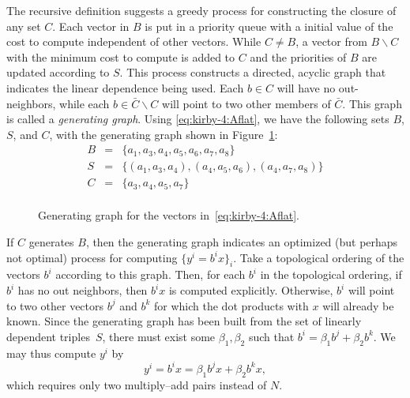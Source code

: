 The recursive definition suggests a greedy process for constructing
the closure of any set $ C $.  Each vector in $B$ is put in a priority
queue with a initial value of the cost to compute independent of other
vectors. While $C \ne B$, a vector from $B \backslash C$ with the
minimum cost to compute is added to $C$ and the priorities of $B$ are
updated according to $S$.  This process constructs a directed, acyclic
graph that indicates the linear dependence being used.  Each $ b \in C
$ will have no out-neighbors, while each $ b \in \bar{C} \backslash C
$ will point to two other members of $ \bar{C} $.  This graph is
called a \emph{generating graph}. Using \eqref{eq:kirby-4:Aflat}, we
have the following sets $B$, $S$, and $C$, with the generating graph
shown in Figure~\ref{fig:kirby-4:gg}:
\begin{equation}
\begin{array}{rcl}
 B & = &  \{a_1, a_3, a_4, a_5, a_6, a_7, a_8\} \\
 S & = & \{(a_1, a_3, a_4),(a_4, a_5, a_6), (a_4, a_7, a_8)\} \\
 C & = & \{a_3, a_4, a_5, a_7\} \\
\end{array}
\end{equation}

\begin{figure}
  \begin{center}
  \def\svgwidth{\columnwidth} %
   
  \caption{Generating graph for the vectors in~\eqref{eq:kirby-4:Aflat}.}
  \label{fig:kirby-4:gg}
  \end{center}
\end{figure}

If $C$ generates $B$, then the generating graph indicates an optimized
(but perhaps not optimal) process for computing $\{ y^i = b^i x \}_i$.
Take a topological ordering of the vectors $b^i$ according to this
graph.  Then, for each $b^i$ in the topological ordering, if $b^i$ has
no out neighbors, then $b^i x$ is computed explicitly.  Otherwise,
$b^i$ will point to two other vectors $b^j$ and $b^k$ for which the
dot products with $x$ will already be known. Since the generating
graph has been built from the set of linearly dependent triples~$S$,
there must exist some $\beta_1, \beta_2$ such that $b^i = \beta_1 b^j
+ \beta_2 b^k$. We may thus compute $y^i$ by
\begin{equation}
y^i = b^i x = \beta_1 b^j x
+ \beta_2  b^k  x,
\end{equation}
which requires only two multiply--add pairs instead of $ N $.

